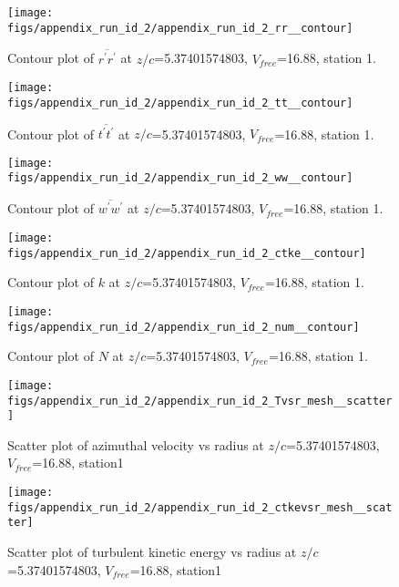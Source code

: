 \begin{figure}[H]
\centering
\texttt{[image: figs/appendix\_run\_id\_2/appendix\_run\_id\_2\_rr\_\_contour]}
\caption{Contour plot of $\overline{r^\prime r^\prime}$ at $z/c$=5.37401574803, $V_{free}$=16.88, station 1.}
\label{fig:appendix_run_id_2_rr__contour}
\end{figure}


\begin{figure}[H]
\centering
\texttt{[image: figs/appendix\_run\_id\_2/appendix\_run\_id\_2\_tt\_\_contour]}
\caption{Contour plot of $\overline{t^\prime t^\prime}$ at $z/c$=5.37401574803, $V_{free}$=16.88, station 1.}
\label{fig:appendix_run_id_2_tt__contour}
\end{figure}


\begin{figure}[H]
\centering
\texttt{[image: figs/appendix\_run\_id\_2/appendix\_run\_id\_2\_ww\_\_contour]}
\caption{Contour plot of $\overline{w^\prime w^\prime}$ at $z/c$=5.37401574803, $V_{free}$=16.88, station 1.}
\label{fig:appendix_run_id_2_ww__contour}
\end{figure}


\begin{figure}[H]
\centering
\texttt{[image: figs/appendix\_run\_id\_2/appendix\_run\_id\_2\_ctke\_\_contour]}
\caption{Contour plot of $k$ at $z/c$=5.37401574803, $V_{free}$=16.88, station 1.}
\label{fig:appendix_run_id_2_ctke__contour}
\end{figure}


\begin{figure}[H]
\centering
\texttt{[image: figs/appendix\_run\_id\_2/appendix\_run\_id\_2\_num\_\_contour]}
\caption{Contour plot of $N$ at $z/c$=5.37401574803, $V_{free}$=16.88, station 1.}
\label{fig:appendix_run_id_2_num__contour}
\end{figure}


\begin{figure}[H]
\centering
\texttt{[image: figs/appendix\_run\_id\_2/appendix\_run\_id\_2\_Tvsr\_mesh\_\_scatter]}
\caption{Scatter plot of azimuthal velocity vs radius at $z/c$=5.37401574803, $V_{free}$=16.88, station1}
\label{fig:appendix_run_id_2_Tvsr_mesh__scatter}
\end{figure}


\begin{figure}[H]
\centering
\texttt{[image: figs/appendix\_run\_id\_2/appendix\_run\_id\_2\_ctkevsr\_mesh\_\_scatter]}
\caption{Scatter plot of turbulent kinetic energy vs radius at $z/c$=5.37401574803, $V_{free}$=16.88, station1}
\label{fig:appendix_run_id_2_ctkevsr_mesh__scatter}
\end{figure}


